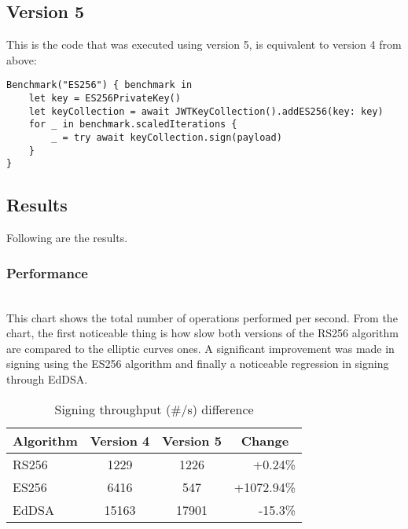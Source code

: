 \subsection*{Version 5}
This is the code that was executed using version 5, is equivalent to version 4 from above:
\begin{verbatim}
Benchmark("ES256") { benchmark in
    let key = ES256PrivateKey()
    let keyCollection = await JWTKeyCollection().addES256(key: key)
    for _ in benchmark.scaledIterations {
        _ = try await keyCollection.sign(payload)
    }
}
\end{verbatim}

\subsection*{Results}
Following are the results.
\subsubsection*{Performance}
 \\
This chart shows the total number of operations performed per second.
From the chart, the first noticeable thing is how slow both versions of the RS256 algorithm are compared to the elliptic curves ones. A significant improvement was made in signing using the ES256 algorithm and finally a noticeable regression in signing through EdDSA.
\begin{table}[h]
    \centering
    \begin{tabular}{lccr}
        \toprule
        Algorithm & Version 4 & Version 5 & \multicolumn{1}{c}{Change} \\
        \midrule
        RS256 & 1229 & 1226 & \textcolor{darkergreen}{+0.24\%} \\
        ES256 & 6416 & 547 & \textcolor{darkergreen}{+1072.94\%} \\
        EdDSA & 15163 & 17901 & \textcolor{darkerred}{-15.3\%} \\
        \bottomrule
    \end{tabular}
    \caption{Signing throughput (\#/s) difference}
\end{table}

